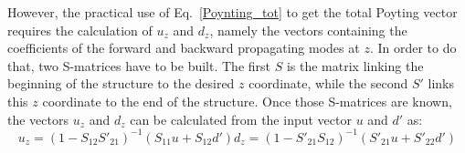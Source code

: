 \documentclass[a4paper,10pt]{report}
\begin{document}
However, the practical use of Eq.~\ref{Poynting_tot} to get the total Poyting vector requires the calculation of $u_z$ and $d_z$, namely the vectors containing the coefficients of the forward and backward propagating modes at $z$. In order to do that, two S-matrices have to be built. The first $S$ is the matrix linking the beginning of the structure to the desired $z$ coordinate, while the second $S'$ links this $z$ coordinate to the end of the structure. Once those S-matrices are known, the vectors $u_z$ and $d_z$ can be calculated from the input vector $u$ and $d'$ as:
\begin{subequations}
\begin{equation}
u_z=\left(1-S_{12}S'_{21} \right)^{-1} \left(S_{11}u + S_{12}d' \right)
\end{equation}
\begin{equation}
d_z=\left(1-S'_{21}S_{12} \right)^{-1} \left(S'_{21}u + S'_{22}d' \right)
\end{equation}
\end{subequations}
\end{document}
